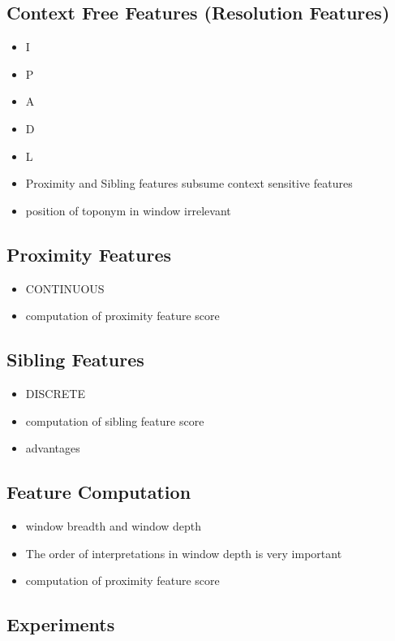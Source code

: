 \documentclass[
     11pt,         %
     a4paper,      %
     oneside,
     ]{article}
\begin{document}
\subsection{Context Free Features (Resolution Features)}
\begin{itemize}
	\item I
	\item P
	\item A
	\item D
	\item L
\end{itemize}

\begin{itemize}
	\item Proximity and Sibling features subsume context sensitive features
	\item position of toponym in window irrelevant
\end{itemize}
\subsection{Proximity Features}
\begin{itemize}
	\item CONTINUOUS
	\item computation of proximity feature score
\end{itemize}
\subsection{Sibling Features}
\begin{itemize}
	\item DISCRETE
	\item computation of sibling feature score
	\item advantages
\end{itemize}
\subsection{Feature Computation}
\begin{itemize}
	\item window breadth and window depth
	\item The order of interpretations in window depth is very important
	\item computation of proximity feature score
\end{itemize}

\subsection{Experiments}
\end{document}
